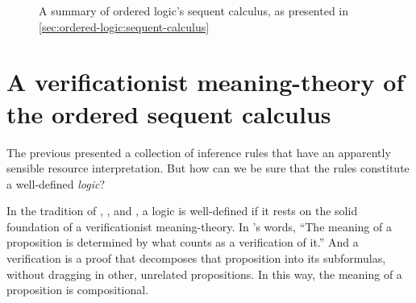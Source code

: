 \begin{figure}[tbp]
  \caption{A summary of  ordered logic's sequent calculus, as presented in \cref{sec:ordered-logic:sequent-calculus}}\label{fig:ordered-logic:sequent-calculus}
\end{figure}

\section{A verificationist meaning-theory of the ordered sequent calculus}\label{sec:ordered-logic:verifications}\label{sec:ordered-logic:meanings}

The previous  presented a collection of inference rules that have an apparently sensible resource interpretation.
But how can we be sure that the rules constitute a well-defined \emph{logic}?

In the tradition of \citeauthor{Gentzen:MZ35}, \citeauthor{Dummett:WJ76}, and \citeauthor{Martin-Lof:Siena83}, a logic is well-defined if it rests on the solid foundation of a verificationist meaning-\-theory.\autocites{Gentzen:MZ35}{Dummett:WJ76}{Martin-Lof:Siena83}
In \citeauthor{Martin-Lof:Siena83}'s words, \enquote{The meaning of a proposition is determined by \textelp{} what counts as a verification of it.}
And a verification is a proof that decomposes that proposition into its subformulas, without dragging in other, unrelated propositions.
In this way, the meaning of a proposition is compositional.

